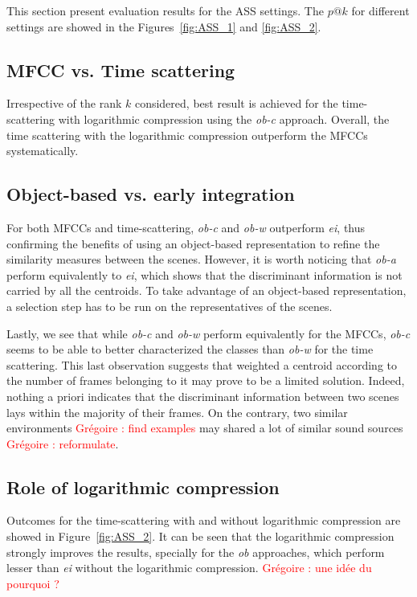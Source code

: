 \documentclass[journal]{IEEEtran}
\makeatletter
\newcommand*{\vs}{vs.\@\xspace}
\newcommand{\gl}[1]{\textcolor{red}{Gr\'egoire : #1}}
\makeatother
\begin{document}
This section present evaluation results for the ASS settings. The $p@k$ for different settings are showed in the Figures~\ref{fig:ASS_1} and \ref{fig:ASS_2}.

\subsection{MFCC \vs Time scattering}

Irrespective of the rank $k$ considered, best result is achieved for the time-scattering with logarithmic compression using the \emph{ob-c} approach. Overall, the time scattering with the logarithmic compression outperform the MFCCs systematically.

\subsection{Object-based \vs early integration}

For both MFCCs and time-scattering, \emph{ob-c} and \emph{ob-w} outperform \emph{ei}, thus confirming the benefits of using an object-based representation to refine the similarity measures between the scenes. However, it is worth noticing that \emph{ob-a} perform equivalently to \emph{ei}, which shows that the discriminant information is not carried by all the centroids. To take advantage of an object-based representation, a selection step has to be run on the representatives of the scenes.

Lastly, we see that while \emph{ob-c} and \emph{ob-w} perform equivalently for the MFCCs, \emph{ob-c} seems to be able to better characterized the classes than \emph{ob-w} for the time scattering. This last observation suggests that weighted a centroid according to the number of frames belonging to it may prove to be a limited solution. Indeed, nothing a priori indicates that the discriminant information between two scenes lays within the majority of their frames. On the contrary, two similar environments  \gl{find examples} may shared a lot of similar sound sources \gl{reformulate}.

\subsection{Role of logarithmic compression}

Outcomes for the time-scattering with and without logarithmic compression are showed in Figure~\ref{fig:ASS_2}. It can be seen that the logarithmic compression strongly improves the results, specially for the \emph{ob} approaches, which perform lesser than \emph{ei} without the logarithmic compression. \gl{une idée du pourquoi ?}
\end{document}

